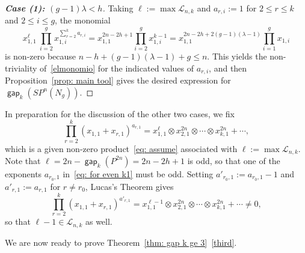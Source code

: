 \documentclass[amscd,amssymb,verbatim,10pt]{amsart}
\numberwithin{equation}{section}
\theoremstyle{plain}
\theoremstyle{definition}
\DeclareMathOperator{\gap}{{\mathsf{gap}}}
\begin{document}
\begin{proof}[\textbf{Case (1): $(g-1)\lambda< h$}]  
Taking $\ell:=\max\mathcal{L}_{n,k}$ and $a_{r,i}:=1$ for $2\leq r\leq k$ and $2\leq i\leq g$, the monomial
    \[
   x_{1,1}^{\ell} \ \prod_{i=2}^gx_{1,i}^{\sum_{r=2}^{k}a_{r,i}}= x_{1,1}^{2n-2h+1}\prod_{i=2}^g x_{1,i}^{k-1}=x_{1,1}^{2n-2h+ 2(g-1)(\lambda-1)}\prod_{i=1}^g x_{1,i}
    \]
is non-zero because $n-h+(g-1)(\lambda-1)+g\le n$. This yields the non-triviality of~\eqref{elmonomio} for the indicated values of $a_{r,i}$, and then Proposition~\ref{prop: main tool} gives the desired expression for $\gap_k(SP^n(N_g))$.  
\end{proof}
In preparation for the discussion of the other two cases, we fix
\begin{equation}\label{eq: for even k1}
\prod_{r=2}^k\left(x_{1,1}+x_{r,1}\right)^{a_{r,1}} = x_{1,1}^{\ell}\otimes x_{2,1}^{2n} \otimes\cdots\otimes x_{k,1}^{2n}+\cdots,
    \end{equation}
    which is a given non-zero product~\eqref{eq: assume} associated with $\ell:=\max\mathcal{L}_{n,k}$. Note that $\ell=2n-\gap_k(P^{2n})=2n-2h+1$ is odd, so that one of the exponents $a_{r_0,1}$ in~\eqref{eq: for even k1} must be odd. Setting $a'_{r_0,1}:=a_{r_0,1}-1$ and $a'_{r,1}:=a_{r,1}$ for $r\neq r_0$, Lucas's Theorem gives
    \begin{equation}\label{eq: for even k2}
\prod_{r=2}^k\left(x_{1,1}+x_{r,1}\right)^{a'_{r,1}} = x_{1,1}^{\ell-1}\otimes x_{2,1}^{2n} \otimes\cdots\otimes x_{k,1}^{2n}+\cdots \ne 0,
    \end{equation}
so that $\ell-1\in\mathcal{L}_{n,k}$ as well.


We are now ready to prove Theorem~\ref{thm: gap k ge 3}~\eqref{third}. 
\end{document}
